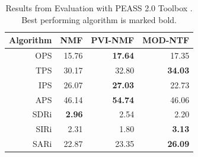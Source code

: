 \begin{table}
\begin{center}
\small
\begin{tabular}{ r | r r r }
  Algorithm & NMF & PVI-NMF & MOD-NTF \\
  \hline
  OPS & 15.76 & \textbf{17.64} & 17.35 \\
  TPS & 30.17 & 32.80 & \textbf{34.03} \\
  IPS & 26.07 & \textbf{27.03} & 22.73 \\
  APS & 46.14 & \textbf{54.74} & 46.06 \\
  \hline
  SDRi & \textbf{2.96} & 2.54 & 2.20 \\
  SIRi & 2.31 & 1.80 & \textbf{3.13} \\
  SARi & 22.87 & 23.35 & \textbf{26.09} \\
\end{tabular}
\end{center}
  \caption{Results from Evaluation with PEASS 2.0 Toolbox \cite{emiya2011subjective}. Best performing algorithm is marked bold.}
  \label{tab:results}
\end{table}

